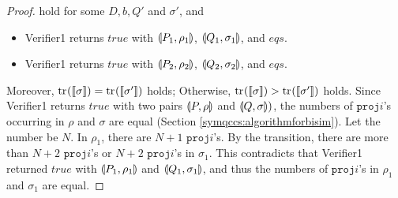 \begin{proof}
 hold for some $D, b, Q'$ and $\sigma'$, and
\begin{itemize}
 \item Verifier1 returns $$ with $$,
       $$, and $$.
 \item Verifier1 returns $$ with $$,
       $$, and $$.
\end{itemize}
 Moreover, $\tr{}{\braw{\sigma}} = $ holds; 
 Otherwise, $\tr{}{\braw{\sigma}} > $ holds.
 Since Verifier1 returns $$ with two pairs
 $$ and $)$,
 the numbers of
 $i$'s occurring in $\rho$ and $\sigma$ are equal
 (Section \ref{symqccs:algorithmforbisim}).
 Let the number be $N$.
 In $\rho_1$, there are $N + 1$ $i$'s.
 By the transition, there are more than $N + 2$ $i$'s or
 $N + 2$ $i$'s in $\sigma_1$. This contradicts that 
 Verifier1 returned $$ with 
 $$ and $$, and thus
 the numbers of $i$'s in $\rho_1$ and $\sigma_1$ are
 equal.


\end{proof}
